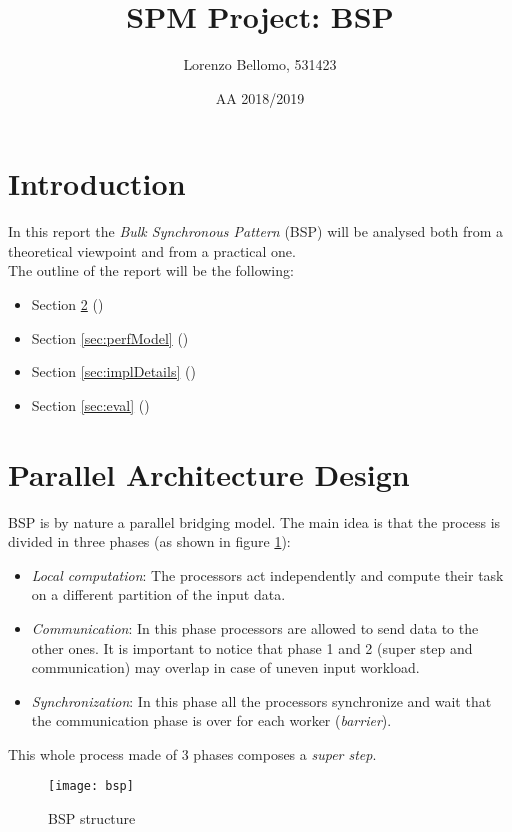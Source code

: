 \documentclass[]{article}
\title{SPM Project: BSP}
\author{Lorenzo Bellomo, 531423}
\date{AA 2018/2019}
\begin{document}
\maketitle

\section{Introduction}

In this report the \emph{Bulk Synchronous Pattern} (BSP) will be analysed both from a theoretical viewpoint and from a practical one. \\
The outline of the report will be the following:
\begin{itemize}
	\item Section \ref{sec:parDesign} ()
	\item Section \ref{sec:perfModel} ()
	\item Section \ref{sec:implDetails} ()
	\item Section \ref{sec:eval} ()
\end{itemize}

\section{Parallel Architecture Design}
\label{sec:parDesign}

BSP is by nature a parallel bridging model. The main idea is that the process is divided in three phases (as shown in figure \ref{fig:BSP}):
\begin{itemize}
	\item \emph{Local computation}: The processors act independently and compute their task on a different partition of the input data.
	\item \emph{Communication}: In this phase processors are allowed to send data to the other ones. It is important to notice that phase 1 and 2 (super step and communication) may overlap in case of uneven input workload.
	\item \emph{Synchronization}: In this phase all the processors synchronize and wait that the communication phase is over for each worker (\emph{barrier}).
\end{itemize}
This whole process made of 3 phases composes a \emph{super step}.
\begin{figure}[H]
	\centering
	\texttt{[image: bsp]}
	\caption{BSP structure}
	\label{fig:BSP}
\end{figure}
\end{document}
